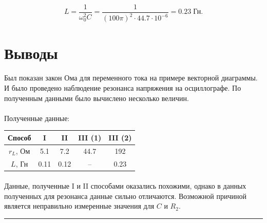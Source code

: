 \documentclass[a4paper,12pt]{article} %
\begin{document}
\[ L = \frac{1}{\omega_0^2 C} = \frac{1}{(100 \pi)^2 \cdot 44.7 \cdot 10^{-6}} = 0.23 \; \text{Гн}.
\]


\section{Выводы}

\paragraph{} Был показан закон Ома для переменного тока на примере векторной диаграммы. И было проведено наблюдение резонанса напряжения на осциллографе. По полученным данными было вычислено несколько величин.

\paragraph{} Полученные данные:

\begin{center}
\begin{tabular}{|c||c|c|c|c|}
\hline 
Способ & I & II & III (1) & III (2) \\ 
\hline 
$r_L$, Ом & 5.1 & 7.2 & 44.7 & 192 \\ 
\hline 
$L$, Гн & 0.11 & 0.12 & -- & 0.23 \\ 
\hline 
\end{tabular} 
\end{center}


\paragraph{} Данные, полученные I и II способами оказались похожими, однако в данных полученных для резонанса данные сильно отличаются. Возможной причиной является неправильно измеренные значения для $C$ и $R_2$.

\medskip\hrule\medskip
\end{document}
